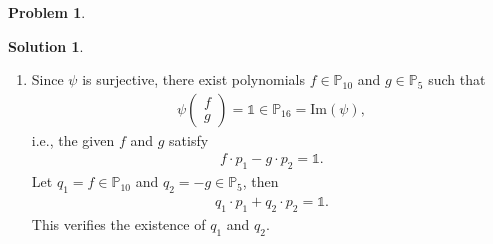 \documentclass{article}
\theoremstyle{definition}
\newtheorem*{prob*}{Problem}
\newtheorem*{sln*}{Solution}
\newcommand{\ima}{\text{Im}}
\begin{document}
\begin{prob*}
\begin{sln*}
\begin{enumerate}
	\item Since $\psi$ is surjective, there exist polynomials $f\in \mathbb{P}_{10}$ and $g\in \mathbb{P}_5$ such that 
	\begin{align*}
	\psi\begin{pmatrix}
	f\\g
	\end{pmatrix} = \mathbb{1} \in \mathbb{P}_{16} = \ima(\psi),
	\end{align*}
	i.e., the given $f$ and $g$ satisfy
	\begin{align*}
	f\cdot p_1 - g\cdot p_2 = \mathbb{1}.
	\end{align*}
	Let $q_1 = f \in \mathbb{P}_{10}$ and $q_2 = -g \in \mathbb{P}_{5}$, then
	\begin{align*}
	q_1 \cdot p_1 + q_2 \cdot p_2 = \mathbb{1}.
	\end{align*}
	This verifies the existence of $q_1$ and $q_2$. 
\end{enumerate}
\end{sln*}


\end{prob*}


\newpage
\end{document}
